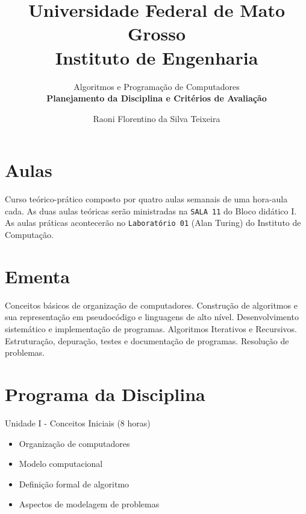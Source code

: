 \documentclass[12pt]{article}
\begin{document}
 
 
\title{Universidade Federal de Mato Grosso\\
Instituto de Engenharia}




\author{Algoritmos e Programa\c{c}\~ao de Computadores \\
{\bf Planejamento da Disciplina e Crit\'erios de Avalia\c{c}\~ao}} %
\date{Raoni Florentino da Silva Teixeira}
\maketitle

\section{Aulas}

Curso te\'orico-pr\'atico composto por quatro aulas semanais de uma hora-aula cada. As duas aulas te\'oricas ser\~ao ministradas na {\tt SALA 11} do Bloco did\'atico I. As aulas pr\'aticas acontecer\~ao no {\tt Laborat\'orio 01} (Alan Turing) do Instituto de Computa\c{c}\~ao. 

\section{Ementa}

Conceitos b\'asicos de organiza\c{c}\~ao de computadores. Constru\c{c}\~ao de algoritmos e sua representa\c{c}\~ao em pseudoc\'odigo e linguagens de alto n\'ivel. 
Desenvolvimento sistem\'atico e implementa\c{c}\~ao de programas. 
Algoritmos Iterativos e Recursivos.
Estrutura\c{c}\~ao, depura\c{c}\~ao, testes e documenta\c{c}\~ao de programas.
Resolu\c{c}\~ao de problemas.

\section{Programa da Disciplina}

\noindent
Unidade I - Conceitos Iniciais (8 horas)
\begin{itemize}
\item Organiza\c{c}\~ao de computadores
\item Modelo computacional
\item Defini\c{c}\~ao formal de algoritmo 
\item Aspectos de modelagem de problemas
\end{itemize}
\end{document}
